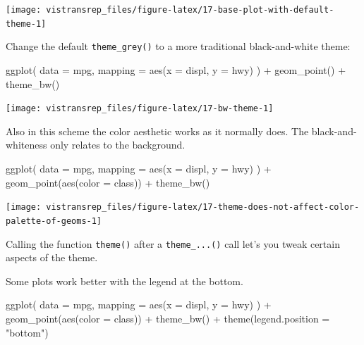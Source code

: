 \documentclass[]{book}
\newenvironment{Shaded}{}{}
\newcommand{\DataTypeTok}[1]{#1}
\newcommand{\KeywordTok}[1]{\textcolor[rgb]{0.00,0.00,1.00}{#1}}
\newcommand{\NormalTok}[1]{#1}
\newcommand{\OperatorTok}[1]{#1}
\newcommand{\StringTok}[1]{\textcolor[rgb]{0.00,0.50,0.50}{#1}}
\begin{document}
\begin{flushright}\texttt{[image: vistransrep\_files/figure-latex/17-base-plot-with-default-theme-1]} \end{flushright}

Change the default \texttt{theme\_grey()} to a more traditional black-and-white theme:

\begin{Shaded}
\begin{Highlighting}[]
\KeywordTok{ggplot}\NormalTok{(}
  \DataTypeTok{data =}\NormalTok{ mpg,}
  \DataTypeTok{mapping =} \KeywordTok{aes}\NormalTok{(}\DataTypeTok{x =}\NormalTok{ displ, }\DataTypeTok{y =}\NormalTok{ hwy)}
\NormalTok{) }\OperatorTok{+}
\StringTok{  }\KeywordTok{geom_point}\NormalTok{() }\OperatorTok{+}
\StringTok{  }\KeywordTok{theme_bw}\NormalTok{()}
\end{Highlighting}
\end{Shaded}

\begin{flushright}\texttt{[image: vistransrep\_files/figure-latex/17-bw-theme-1]} \end{flushright}

Also in this scheme the color aesthetic works as it normally does.
The black-and-whiteness only relates to the background.

\begin{Shaded}
\begin{Highlighting}[]
\KeywordTok{ggplot}\NormalTok{(}
  \DataTypeTok{data =}\NormalTok{ mpg,}
  \DataTypeTok{mapping =} \KeywordTok{aes}\NormalTok{(}\DataTypeTok{x =}\NormalTok{ displ, }\DataTypeTok{y =}\NormalTok{ hwy)}
\NormalTok{) }\OperatorTok{+}
\StringTok{  }\KeywordTok{geom_point}\NormalTok{(}\KeywordTok{aes}\NormalTok{(}\DataTypeTok{color =}\NormalTok{ class)) }\OperatorTok{+}
\StringTok{  }\KeywordTok{theme_bw}\NormalTok{()}
\end{Highlighting}
\end{Shaded}

\begin{flushright}\texttt{[image: vistransrep\_files/figure-latex/17-theme-does-not-affect-color-palette-of-geoms-1]} \end{flushright}

Calling the function \texttt{theme()} after a \texttt{theme\_...()} call let's you tweak certain aspects of the theme.

Some plots work better with the legend at the bottom.

\begin{Shaded}
\begin{Highlighting}[]
\KeywordTok{ggplot}\NormalTok{(}
  \DataTypeTok{data =}\NormalTok{ mpg,}
  \DataTypeTok{mapping =} \KeywordTok{aes}\NormalTok{(}\DataTypeTok{x =}\NormalTok{ displ, }\DataTypeTok{y =}\NormalTok{ hwy)}
\NormalTok{) }\OperatorTok{+}
\StringTok{  }\KeywordTok{geom_point}\NormalTok{(}\KeywordTok{aes}\NormalTok{(}\DataTypeTok{color =}\NormalTok{ class)) }\OperatorTok{+}
\StringTok{  }\KeywordTok{theme_bw}\NormalTok{() }\OperatorTok{+}
\StringTok{  }\KeywordTok{theme}\NormalTok{(}\DataTypeTok{legend.position =} \StringTok{"bottom"}\NormalTok{)}
\end{Highlighting}
\end{Shaded}
\end{document}
